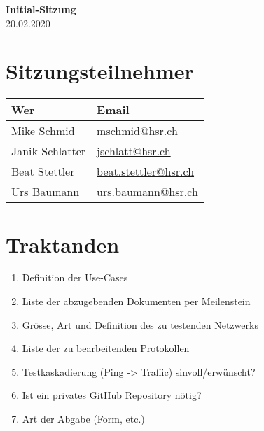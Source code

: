 \documentclass[
	ngerman,
	toc=listof, %
	toc=bibliography, %
	footnotes=multiple, %
	parskip=half, %
	numbers=noendperiod %
]{scrartcl}
\newcommand{\titel}{Initial-Sitzung}
\newcommand{\datum}{20.02.2020}
\begin{document}
\begin{center}
    \LARGE \textbf{\titel} \\[2ex]
    \large \datum \\[2ex]
\end{center}

\section*{Sitzungsteilnehmer}
\begin{tabularx}{0.9\linewidth}{Xl}
	\toprule
	Wer & Email \\
	\midrule
	Mike Schmid & \scriptsize \url{mschmid@hsr.ch} \\
	Janik Schlatter & \scriptsize \url{jschlatt@hsr.ch} \\
	Beat Stettler & \scriptsize \url{beat.stettler@hsr.ch} \\
	Urs Baumann & \scriptsize \url{urs.baumann@hsr.ch} \\
	\bottomrule
\end{tabularx}

\section*{Traktanden}
\begin{enumerate}
    \item Definition der Use-Cases
    \item Liste der abzugebenden Dokumenten per Meilenstein
    \item Grösse, Art und Definition des zu testenden Netzwerks
    \item Liste der zu bearbeitenden Protokollen
    \item Testkaskadierung (Ping -> Traffic) sinvoll/erwünscht?
    \item Ist ein privates GitHub Repository nötig?
    \item Art der Abgabe (Form, etc.)
\end{enumerate}
\end{document}
